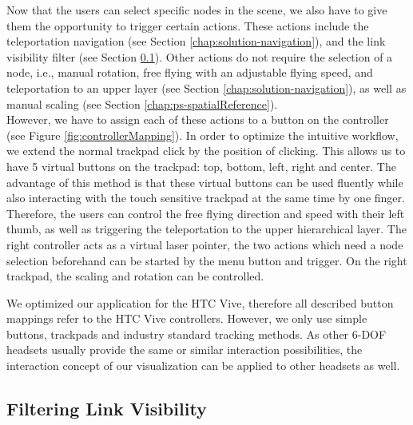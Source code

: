 Now that the users can select specific nodes in the scene, we also have to give them the opportunity to trigger certain actions. These actions include the teleportation navigation (see Section \ref{chap:solution-navigation}), and the link visibility filter (see Section \ref{chap:ps-filterLinks}). 
Other actions do not require the selection of a node, i.e., manual rotation, free flying with an adjustable flying speed, and teleportation to an upper layer (see Section \ref{chap:solution-navigation}), as well as manual scaling (see Section \ref{chap:ps-spatialReference}).\\
However, we have to assign each of these actions to a button on the controller (see Figure \ref{fig:controllerMapping}). In order to optimize the intuitive workflow, we extend the normal trackpad click by the position of clicking. 
This allows us to have 5 virtual buttons on the trackpad: top, bottom, left, right and center. The advantage of this method is that these virtual buttons can be used fluently while also interacting with the touch sensitive trackpad at the same time by one finger. 
Therefore, the users can control the free flying direction and speed with their left thumb, as well as triggering the teleportation to the upper hierarchical layer. The right controller acts as a virtual laser pointer, the two actions which need a node selection beforehand can be started by the menu button and trigger. 
On the right trackpad, the scaling and rotation can be controlled.

We optimized our application for the HTC Vive, therefore all described button mappings refer to the HTC Vive controllers. However, we only use simple buttons, trackpads and industry standard tracking methods. 
As other 6-DOF headsets usually provide the same or similar interaction possibilities, the interaction concept of our visualization can be applied to other headsets as well.

\subsection{Filtering Link Visibility}
\label{chap:ps-filterLinks}

